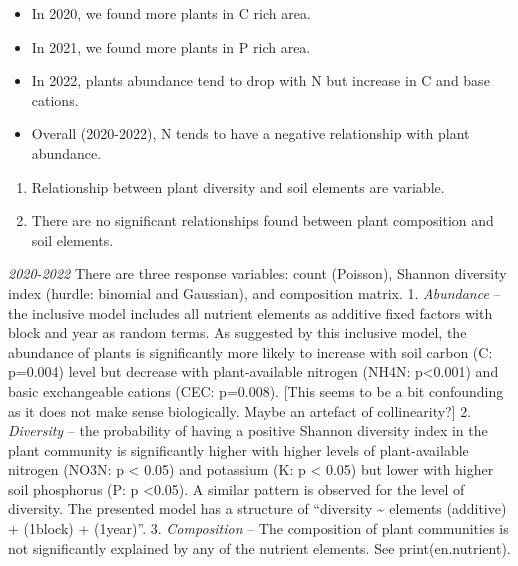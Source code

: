 \documentclass[
]{article}
\providecommand{\tightlist}{%
  \setlength{\itemsep}{0pt}\setlength{\parskip}{0pt}}
\begin{document}
\begin{itemize}
\tightlist
\item
  In 2020, we found more plants in C rich area.
\item
  In 2021, we found more plants in P rich area.
\item
  In 2022, plants abundance tend to drop with N but increase in C and
  base cations.
\item
  Overall (2020-2022), N tends to have a negative relationship with
  plant abundance.
\end{itemize}

\begin{enumerate}
\def\labelenumi{\arabic{enumi}.}
\setcounter{enumi}{2}
\item
  Relationship between plant diversity and soil elements are variable.
\item
  There are no significant relationships found between plant composition
  and soil elements.
\end{enumerate}

\emph{2020-2022} There are three response variables: count (Poisson),
Shannon diversity index (hurdle: binomial and Gaussian), and composition
matrix. 1. \emph{Abundance} -- the inclusive model includes all nutrient
elements as additive fixed factors with block and year as random terms.
As suggested by this inclusive model, the abundance of plants is
significantly more likely to increase with soil carbon (C: p=0.004)
level but decrease with plant-available nitrogen (NH4N: p\textless0.001)
and basic exchangeable cations (CEC: p=0.008). {[}This seems to be a bit
confounding as it does not make sense biologically. Maybe an artefact of
collinearity?{]} 2. \emph{Diversity} -- the probability of having a
positive Shannon diversity index in the plant community is significantly
higher with higher levels of plant-available nitrogen (NO3N: p
\textless{} 0.05) and potassium (K: p \textless{} 0.05) but lower with
higher soil phosphorus (P: p \textless0.05). A similar pattern is
observed for the level of diversity. The presented model has a structure
of ``diversity \textasciitilde{} elements (additive) + (1\textbar block)
+ (1\textbar year)''. 3. \emph{Composition} -- The composition of plant
communities is not significantly explained by any of the nutrient
elements. See print(en.nutrient).
\end{document}
